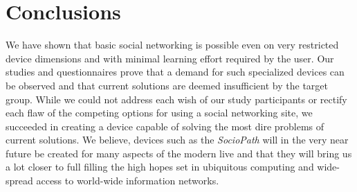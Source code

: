 \section{Conclusions}
%
We have shown that basic social networking is possible even on very restricted 
device dimensions and with minimal learning effort required by the user. 
Our studies and questionnaires prove that a demand for such specialized 
devices can be observed and that current solutions are deemed insufficient 
by the target group. While we could not address each wish of our study 
participants or rectify each flaw of the competing options for using 
a social networking site, we succeeded in creating a device capable of 
solving the most dire problems of current solutions. We believe, devices 
such as the \emph{SocioPath} will in the very near future be created for 
many aspects of the modern live and that they will bring us a lot closer 
to full filling the high hopes set in ubiquitous computing and wide-spread 
access to world-wide information networks.
